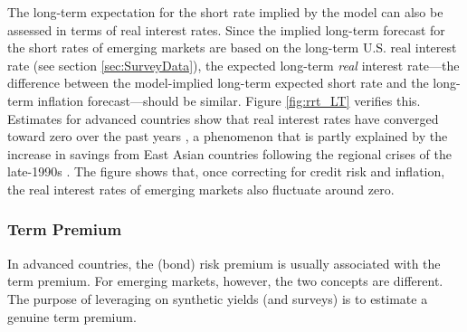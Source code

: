 {The long-term expectation for the short rate implied by the model can also be assessed in terms of real interest rates.
Since the implied long-term forecast for the short rates of emerging markets are based on the long-term U.S. real interest rate (see section \ref{sec:SurveyData}), the expected long-term \textit{real} interest rate---the difference between the model-implied long-term expected short rate and the long-term inflation forecast---should be similar.
Figure \ref{fig:rrt_LT} verifies this.
Estimates for advanced countries show that real interest rates have converged toward zero over the past years \citep*{HolstonLaubachWilliams:2017}, a phenomenon that is partly explained by the increase in savings from East Asian countries following the regional crises of the late-1990s \citep{Obstfeld:2020}.
The figure shows that, once correcting for credit risk and inflation, the real interest rates of emerging markets also fluctuate around zero.

\subsubsection{Term Premium} \label{sec:TP}
\iftoggle{toclinks}{\gototoc}{} %

In advanced countries, the (bond) risk premium is usually associated with the term premium.
For emerging markets, however, the two concepts are different.
The purpose of leveraging on synthetic yields (and surveys) is to estimate a genuine term premium.

}
